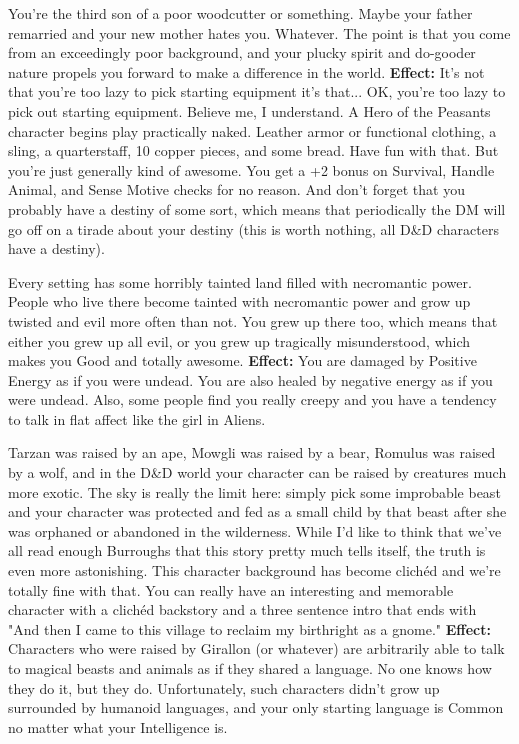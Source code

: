 \medskip{}
{You're the third son of a poor woodcutter or something. Maybe your father remarried and your new mother hates you. Whatever. The point is that you come from an exceedingly poor background, and your plucky spirit and do-gooder nature propels you forward to make a difference in the world.}
\textbf{Effect:}{ It's not that you're too lazy to pick starting equipment it's that... OK, you're too lazy to pick out starting equipment. Believe me, I understand. A Hero of the Peasants character begins play practically naked. Leather armor or functional clothing, a sling, a quarterstaff, 10 copper pieces, and some bread. Have fun with that. But you're just generally kind of awesome. You get a +2 bonus on Survival, Handle Animal, and Sense Motive checks for no reason. And don't forget that you probably have a destiny of some sort, which means that periodically the DM will go off on a tirade about your destiny (this is worth nothing, all D\&D characters have a destiny).}

\medskip{}
{Every setting has some horribly tainted land filled with necromantic power. People who live there become tainted with necromantic power and grow up twisted and evil more often than not. You grew up there too, which means that either you grew up all evil, or you grew up tragically misunderstood, which makes you Good and totally awesome.}
\textbf{Effect:}{ You are damaged by Positive Energy as if you were undead. You are also healed by negative energy as if you were undead. Also, some people find you really creepy and you have a tendency to talk in flat affect like the girl in Aliens.}

\medskip{}
{Tarzan was raised by an ape, Mowgli was raised by a bear, Romulus was raised by a wolf, and in the D\&D world your character can be raised by creatures much more exotic. The sky is really the limit here: simply pick some improbable beast and your character was protected and fed as a small child by that beast after she was orphaned or abandoned in the wilderness. While I'd like to think that we've all read enough Burroughs that this story pretty much tells itself, the truth is even more astonishing. This character background has become clich\'ed and we're totally fine with that. You can really have an interesting and memorable character with a clich\'ed backstory and a three sentence intro that ends with "And then I came to this village to reclaim my birthright as a gnome."}
\textbf{Effect:}{ Characters who were raised by Girallon (or whatever) are arbitrarily able to talk to magical beasts and animals as if they shared a language. No one knows how they do it, but they do. Unfortunately, such characters didn't grow up surrounded by humanoid languages, and your only starting language is Common no matter what your Intelligence is.}

